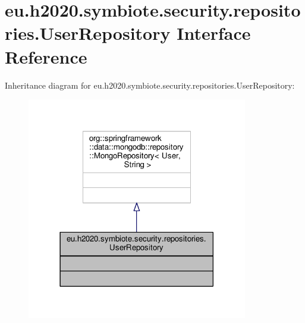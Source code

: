 \hypertarget{interfaceeu_1_1h2020_1_1symbiote_1_1security_1_1repositories_1_1UserRepository}{}\section{eu.\+h2020.\+symbiote.\+security.\+repositories.\+User\+Repository Interface Reference}
\label{interfaceeu_1_1h2020_1_1symbiote_1_1security_1_1repositories_1_1UserRepository}


Inheritance diagram for eu.\+h2020.\+symbiote.\+security.\+repositories.\+User\+Repository\+:
\nopagebreak
\begin{figure}[H]
\begin{center}
\leavevmode
\includegraphics[width=273pt]{interfaceeu_1_1h2020_1_1symbiote_1_1security_1_1repositories_1_1UserRepository__inherit__graph}
\end{center}
\end{figure}


